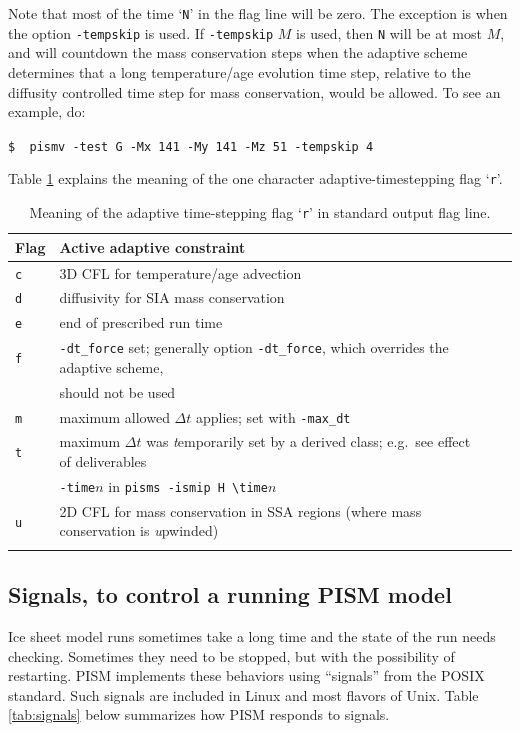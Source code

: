 \documentclass[11pt,final]{amsart}
\begin{document}
Note that most of the time `\verb|N|' in the flag line will be zero.  The exception is when the option \verb|-tempskip| is used.  If \verb|-tempskip| $M$ is used, then \verb|N| will be at most $M$, and will countdown the mass conservation steps when the adaptive scheme determines that a long temperature/age evolution time step, relative to the diffusity controlled time step for mass conservation, would be allowed.  To see an example, do:

\verb|$  pismv -test G -Mx 141 -My 141 -Mz 51 -tempskip 4|

Table \ref{tab:adaptiveflag} explains the meaning of the one character adaptive-timestepping flag `\verb|r|'.

\begin{table}[ht]
\caption{Meaning of the adaptive time-stepping flag `\texttt{r}' in standard output flag line.}\label{tab:adaptiveflag}
\begin{tabular}{@{}llll}\hline
\textbf{Flag} & \textbf{Active adaptive constraint} \\ \hline
\verb|c| & 3D CFL for temperature/age advection \cite{BBL} \\
\verb|d| & diffusivity for SIA mass conservation \cite{BBL} \\
\verb|e| & end of prescribed run time \\
\verb|f| & \verb|-dt_force| set; generally option \verb|-dt_force|, which overrides the adaptive scheme, \\
 & should not be used  \\
\verb|m| & maximum allowed $\Delta t$ applies; set with \verb|-max_dt| \\
\verb|t| & maximum $\Delta t$ was \emph{t}emporarily set by a derived class; e.g.~see effect of deliverables \\
 & \verb|-time|$n$ in \verb|pisms -ismip H \time|$n$ \\
\verb|u| & 2D CFL for mass conservation in SSA regions (where mass conservation is \emph{u}pwinded)\\
\hline
\normalsize
\end{tabular}
\end{table}


\subsection{Signals, to control a running PISM model} \label{subsect:signal}    Ice sheet model runs sometimes take a long time and the state of the run needs checking.  Sometimes they need to be stopped, but with the possibility of restarting.  PISM implements these behaviors using ``signals'' from the POSIX standard.  Such signals are included in Linux and most flavors of Unix.  Table \ref{tab:signals} below summarizes how PISM responds to signals.
\end{document}
